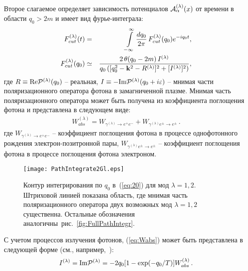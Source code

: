 Второе слагаемое определяет зависимость потенциалов ${\cal A}^{(\lambda)}_\alpha(x)$ от времени
в области $q_0>2m$ и имеет вид
фурье-интеграла:
%
\begin{eqnarray}
F^{(\lambda)}_{cut}(t) &=& \int \limits_{- \infty}^{\infty} \frac{dq_0}{2 \pi}\,
F^{(\lambda)}_{cut}(q_0)e^{- i q_0 t},
\label{eq:20} 
\\
F^{(\lambda)}_{cut}(q_0) &\simeq& 
\frac{2 \,\theta (q_0  -  2 m)\,I^{(\lambda)}}
{q_0\,([ q_0^2 - {\bf k}^2 - R^{(\lambda)}]^2 + [I^{(\lambda)}]^2)},
\label{eq:21}
\end{eqnarray}
%
где $R \equiv \text{Re} {\cal P}^{(\lambda)}(q_0)$  – реальная, $I \equiv  - \text{Im} {\cal P}^{(\lambda)}(q_0 + i \varepsilon)$ – мнимая 
части поляризационного оператора фотона в замагниченной плазме.
\newpage
Мнимая часть поляризационного оператора может быть получена из коэффициента  
поглощения фотона и представлена в следующем виде:
\begin{eqnarray}
W^{(\lambda)}_{abs} = W_{\gamma^{(\lambda)} \to e^+ e^-} + W_{\gamma^{(\lambda)} e^{\pm} \to e^{\pm}} \, .
\label{eq:Wabs}
\end{eqnarray}
где $W_{\gamma^{(\lambda)} \to e^+ e^-}$ -- коэффициент поглощения фотона в процессе однофотонного рождения электрон-позитронной пары, $W_{\gamma^{(\lambda)} e^{\pm} \to e^{\pm}}$ -- коэффициент поглощения фотона в процессе поглощения фотона электроном.

\begin{figure}[t]\centering
	\texttt{[image: PathIntegrate2Gl.eps]}
	\caption{Контур интегрирования по $q_0$ в~(\ref{eq:20}) для мод $\lambda = 1,2$. Штриховой линией показана область, где мнимая часть поляризационного оператора двух возможных мод $\lambda = 1,2$ существенна. Остальные обозначения аналогичны~рис.~\ref{fig:FullPathIntegr}.}\label{fig:PathIntegr}
\end{figure}

С учетом процессов излучения фотонов, (\ref{eq:Wabs}) может быть представлена в следующей форме (см., например,~\cite{Shabad:1988, Rumyantsev:2017,Weldon:1983}): 
\begin{eqnarray}\label{eq:Ilambda}
I^{(\lambda)}=\text{Im} {\cal P}^{(\lambda)} =  -2 q_0 [1-\exp (-q_0/T)] W^{(\lambda)}_{abs} \, . 
\label{eq:ImP}
\end{eqnarray}

